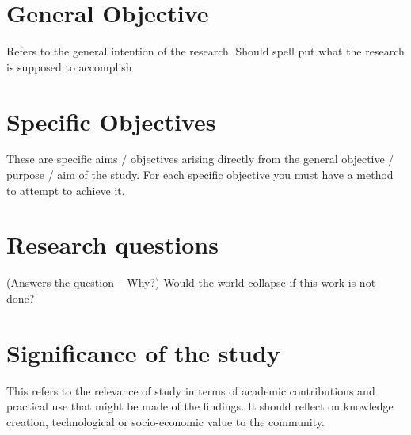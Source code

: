 \section{General Objective}
Refers to the general intention of the research. Should spell put what the research is supposed to accomplish

\section{Specific Objectives}

These are specific aims / objectives arising directly from the general objective / purpose / aim of the study. For each specific objective you must have a method to attempt to achieve it.

\section{Research questions}
(Answers the question – Why?)
Would the world collapse if this work is not done?

\section{Significance of the study}
This refers to the relevance of study in terms of academic contributions and practical use that might be made of the findings. It should reflect on knowledge creation, technological or socio-economic value to the community.
